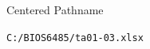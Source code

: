 \documentclass[14pt,t]{beamer}
\begin{document}
\begin{frame}{Centered Pathname}
\begin{center}
\texttt{C:/BIOS6485/ta01-03.xlsx}
\end{center}
\end{frame}
\end{document}
